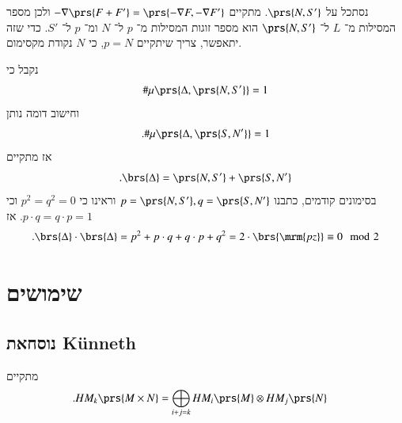\documentclass[a4paper,10pt,twoside,openany]{book}
\begin{document}
\begin{example}
נסתכל על
$\prs{N,S'}$.
מתקיים
$-\nabla\prs{F + F'} = \prs{-\nabla F, -\nabla F'}$
ולכן מספר המסילות מ־%
$L$
ל־%
$\prs{N,S'}$
הוא מספר זוגות המסילות מ־%
$p$
ל־%
$N$
ומ־%
$p$
ל־%
$S'$.
כדי שזה יתאפשר, צריך שיתקיים
$p = N$,
כי
$N$
נקודת מקסימום.

נקבל כי
\[\# \mu\prs{\Delta, \prs{N,S'}} = 1\]
וחישוב דומה נותן
\[\text{.} \# \mu\prs{\Delta, \prs{S,N'}} = 1\]
אז מתקיים
\[\text{.} \brs{\Delta} = \prs{N, S'} + \prs{S,N'}\]
בסימונים קודמים, כתבנו
$p = \prs{N,S'}, q = \prs{S, N'}$
וראינו כי
$p^2 = q^2 = 0$
וכי
$p \cdot q = q \cdot p = 1$.
אז
\[\text{.} \brs{\Delta} \cdot \brs{\Delta} = p^2 + p \cdot q + q \cdot p + q^2 = 2 \cdot \brs{\mrm{pz}} \equiv 0 \mod{2}\]
\end{example}

\section{שימושים}

\subsection{נוסחאת \textenglish{Künneth}}

\begin{theorem}
מתקיים
\begin{align*}
\text{.} HM_k\prs{M \times N} &= \bigoplus_{i+j = k} HM_i\prs{M} \otimes HM_j\prs{N}
\end{align*}
\end{theorem}
\end{document}
